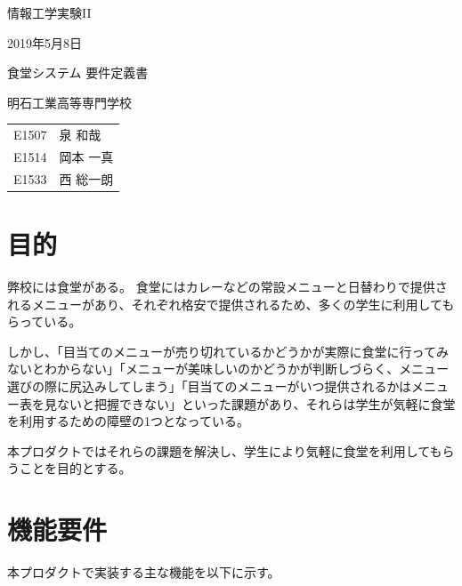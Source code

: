 \documentclass[a4paper]{jsarticle}
\begin{document}

\large
\vspace{-5.0cm}
\hspace{-1.0cm}
情報工学実験II

\hspace{-1.0cm}
2019年5月8日

\Huge
\vspace{1.0cm}
\begin{center}
  食堂システム 要件定義書
\end{center}

\vspace{0.5cm}
\begin{center}
  \LARGE
  明石工業高等専門学校
\end{center}

\LARGE
\begin{center}
  \begin{tabular}{rl}
    E1507 & 泉 和哉 \\
    E1514 & 岡本 一真 \\
    E1533 & 西 総一朗
  \end{tabular}
\end{center}

\normalsize

\tableofcontents
\thispagestyle{empty}
\clearpage
\setcounter{page}{1}


\section{目的}
弊校には食堂がある。  食堂にはカレーなどの常設メニューと日替わりで提供されるメニューがあり、それぞれ格安で提供されるため、多くの学生に利用してもらっている。

しかし、「目当てのメニューが売り切れているかどうかが実際に食堂に行ってみないとわからない」「メニューが美味しいのかどうかが判断しづらく、メニュー選びの際に尻込みしてしまう」「目当てのメニューがいつ提供されるかはメニュー表を見ないと把握できない」といった課題があり、それらは学生が気軽に食堂を利用するための障壁の1つとなっている。

本プロダクトではそれらの課題を解決し、学生により気軽に食堂を利用してもらうことを目的とする。

\section{機能要件}
本プロダクトで実装する主な機能を以下に示す。
\end{document}
